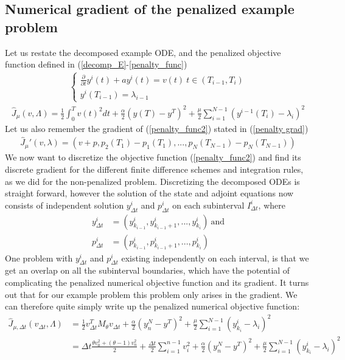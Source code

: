 \subsection{Numerical gradient of the penalized example problem} \label{num_grad_sec2}
Let us restate the decomposed example ODE, and the penalized objective function defined in (\ref{decomp_E}-\ref{penalty_func})
\begin{align}
\left\{
     \begin{array}{lr}
       	\frac{\partial}{\partial t} y^i(t)+a y^i(t) = v(t) \ t\in(T_{i-1},T_{i})\\
       	y^i(T_{i-1})=\lambda_{i-1}
     \end{array}
   \right. \label{decomp_E2}
\end{align}
\begin{align}
\hat J_{\mu}(v,\Lambda) = \frac{1}{2}\int_0^Tv(t)^2dt + \frac{\alpha}{2}(y(T)-y^T)^2 + \frac{\mu}{2}\sum_{i=1}^{N-1}(y^{i-1}(T_i)-\lambda_i)^2 \label{penalty_func2}
\end{align}
Let us also remember the gradient of (\ref{penalty_func2}) stated in (\ref{penalty grad})
\begin{align}
\hat J_{\mu}'(v,\lambda) = (v+p,p_{2}(T_1) -p_{1}(T_1),..., p_{N}(T_{N-1}) -p_{N}(T_{N-1})) \label{penalty grad2}
\end{align}
We now want to discretize the objective function (\ref{penalty_func2}) and find its discrete gradient for the different finite difference schemes and integration rules, as we did for the non-penalized problem. Discretizing the decomposed ODEs is straight forward, however the solution of the state and adjoint equations now consists of independent solution $y_{\Delta t}^i$ and $p_{\Delta t}^i$ on each subinterval $I_{\Delta t}^i$, where 
\begin{align*}
y_{\Delta t}^i &= (y_{k_{i-1}}^i,y_{k_{i-1}+1}^i,...,y_{k_{i}}^i) \ \text{and} \\
p_{\Delta t}^i &= (p_{k_{i-1}}^i,p_{k_{i-1}+1}^i,...,p_{k_{i}}^i)
\end{align*} 
One problem with $y_{\Delta t}^i$ and $p_{\Delta t}^i$ existing independently on each interval, is that we get an overlap on all the subinterval boundaries, which have the potential of complicating the penalized numerical objective function and its gradient. It turns out that for our example problem this problem only arises in the gradient. We can therefore quite simply write up the penalized numerical objective function:
\begin{align}
\hat J_{\mu,\Delta t}(v_{\Delta t},\Lambda)&=\frac{1}{2} v_{\Delta t}^TM_{\theta}v_{\Delta t}+ \frac{\alpha}{2}(y_n^{N}-y^T)^2 +\frac{\mu }{2}\sum_{i=1}^{N-1} (y_{k_i}^{i}-\lambda_i)^2\\
&=\Delta t\frac{\theta v_0^2+(\theta-1)v_n^2}{2} + \frac{\Delta t}{2}\sum_{i=1}^{n-1} v_i^2 + \frac{\alpha}{2}(y_n^N-y^T)^2+\frac{\mu }{2}\sum_{i=1}^{N-1} (y_{k_i}^{i}-\lambda_i)^2 \label{pen disc f}
\end{align}
